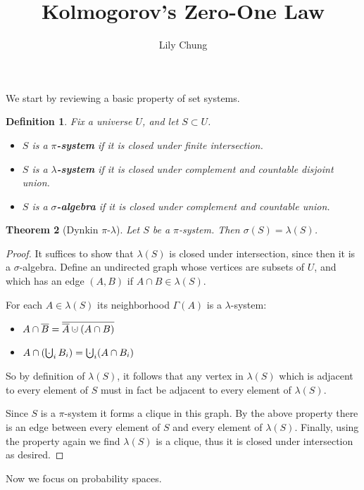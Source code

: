 \documentclass[11pt,a4paper]{article}
\title{Kolmogorov's Zero-One Law}
\author{
  Lily Chung
}
\date{}
\makeatletter
\newtheorem{theorem}{Theorem}
\newtheorem{definition}[theorem]{Definition}
\newcommand*{\defn}[1]{\textbf{#1}}
\newcommand{\superimpose}[2]{{%
  \ooalign{%
    \hfil$\m@th#1\@firstoftwo#2$\hfil\cr
    \hfil$\m@th#1\@secondoftwo#2$\hfil\cr
  }%
}}
\newcommand{\dotcup}[0]{\mathbin{\mathpalette\superimpose{{\cdot}{\cup}}}}
\DeclareMathOperator*{\bigdotcup}{\mathpalette\superimpose{{\cdot}{\bigcup}}}
\makeatother
\begin{document}
\maketitle

We start by reviewing a basic property of set systems.

\begin{definition}
  Fix a universe $U$, and let $S \subset U$.
  \begin{itemize}
  \item $S$ is a \defn{$\pi$-system} if it is closed under finite intersection.
  \item $S$ is a \defn{$\lambda$-system} if it is closed under complement and countable disjoint union.
  \item $S$ is a \defn{$\sigma$-algebra} if it is closed under complement and countable union.
  \end{itemize}
\end{definition}

\begin{theorem}[Dynkin $\pi$-$\lambda$]
  \label{thm:dynkin}
  Let $S$ be a $\pi$-system.  Then $\sigma(S) = \lambda(S)$.
\end{theorem}
\begin{proof}
  It suffices to show that $\lambda(S)$ is closed under intersection,
  since then it is a $\sigma$-algebra.
  Define an undirected graph whose vertices are subsets of $U$,
  and which has an edge $(A, B)$ if $A \cap B \in \lambda(S)$.

  For each $A \in \lambda(S)$ its neighborhood $\Gamma(A)$ is a $\lambda$-system:
  \begin{itemize}
  \item $A \cap \overline{B} = \overline{\overline{A} \dotcup (A \cap B)}$
  \item $A \cap \left(\bigdotcup_i B_i\right) = \bigdotcup_i (A \cap B_i)$
  \end{itemize}
  So by definition of $\lambda(S)$, it follows that any vertex in $\lambda(S)$ which is adjacent to every element of $S$ must in fact be adjacent to every element of $\lambda(S)$.

  Since $S$ is a $\pi$-system it forms a clique in this graph.
  By the above property there is an edge between every element of $S$ and every element of $\lambda(S)$.
  Finally, using the property again we find $\lambda(S)$ is a clique,
  thus it is closed under intersection as desired.
\end{proof}

Now we focus on probability spaces.
\end{document}

